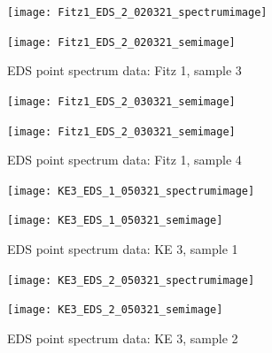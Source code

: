 \begin{figure}[H]
\centering
\begin{minipage}{.45\textwidth}
  \centering
  \texttt{[image: Fitz1\_EDS\_2\_020321\_spectrumimage]}
\end{minipage}
\begin{minipage}{.45\textwidth}
  \centering
  \texttt{[image: Fitz1\_EDS\_2\_020321\_semimage]}
\end{minipage}
\caption[EDS point spectrum data: Fitz 1, sample 3]{EDS point spectrum data: Fitz 1, sample 3}
\label{fig:fitz1_point_eds_3}
\end{figure}

\begin{figure}[H]
\centering
\begin{minipage}{.45\textwidth}
  \centering
  \texttt{[image: Fitz1\_EDS\_2\_030321\_semimage]}
\end{minipage}
\begin{minipage}{.45\textwidth}
  \centering
  \texttt{[image: Fitz1\_EDS\_2\_030321\_semimage]}
\end{minipage}
\caption[EDS point spectrum data: Fitz 1, sample 4]{EDS point spectrum data: Fitz 1, sample 4}
\label{fig:fitz1_point_eds_4}
\end{figure}



\begin{figure}[H]
\centering
\begin{minipage}{.45\textwidth}
  \centering
  \texttt{[image: KE3\_EDS\_1\_050321\_spectrumimage]}
\end{minipage}
\begin{minipage}{.45\textwidth}
  \centering
  \texttt{[image: KE3\_EDS\_1\_050321\_semimage]}
\end{minipage}
\caption[EDS point spectrum data: KE 3, sample 1]{EDS point spectrum data: KE 3, sample 1}
\label{fig:ke3_point_eds_1}
\end{figure}

\begin{figure}[H]
\centering
\begin{minipage}{.45\textwidth}
  \centering
  \texttt{[image: KE3\_EDS\_2\_050321\_spectrumimage]}
\end{minipage}
\begin{minipage}{.45\textwidth}
  \centering
  \texttt{[image: KE3\_EDS\_2\_050321\_semimage]}
\end{minipage}
\caption[EDS point spectrum data: KE 3, sample 2]{EDS point spectrum data: KE 3, sample 2}
\label{fig:ke3_point_eds_2}
\end{figure}




